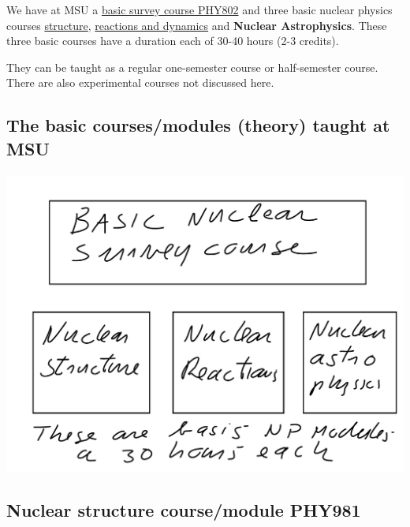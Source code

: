 \documentclass[%
twoside,                 %
final,                   %
10pt]{article}
\begin{document}
\noindent
We have at MSU a  \href{{https://people.nscl.msu.edu/~witek/Classes/PHY802/NuclPhys802-2015.html}}{basic survey course PHY802}  and three basic nuclear physics courses \href{{http://nuclearstructure.github.io/PHY981/doc/web/course.html}}{structure}, \href{{https://people.nscl.msu.edu/~nunes/phy982/phy982web2015.htm}}{reactions and dynamics}  and \textbf{Nuclear Astrophysics}. These three basic courses
have a duration each  of 30-40 hours (2-3 credits).   

They can be taught as a regular one-semester course or half-semester course. There are also experimental courses not discussed here.




\subsection*{The basic courses/modules (theory) taught at MSU}

\paragraph{}


\centerline{\includegraphics[width=0.5\linewidth]{struct1.pdf}}




\subsection*{Nuclear structure course/module  PHY981}

\end{document}
